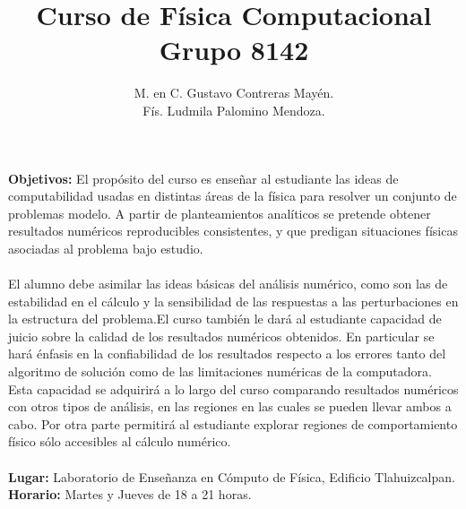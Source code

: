 \documentclass[12pt]{article}
\author{M. en C. Gustavo Contreras May\'{e}n.\\
F\'{i}s. Ludmila Palomino Mendoza.}
\title{Curso de F\'{i}sica Computacional\\{\large Grupo 8142}}
\date{ }
\begin{document}
\renewcommand\labelenumii{\theenumi.{\arabic{enumii}}}
\maketitle
\fontsize{12}{12}\selectfont
\textbf{Objetivos:}
El prop\'{o}sito del curso es enseñar al estudiante las ideas de computabilidad usadas en distintas \'{a}reas de la  f\'{i}sica para resolver un conjunto de problemas modelo. A partir de planteamientos anal\'{i}ticos se pretende obtener resultados num\'{e}ricos reproducibles consistentes, y que predigan situaciones f\'{i}sicas asociadas al problema bajo estudio.
\\
\\
El alumno debe asimilar las ideas b\'{a}sicas del análisis num\'{e}rico, como son las de estabilidad en el c\'{a}lculo y la sensibilidad de las respuestas a las perturbaciones en la estructura del problema.El curso tambi\'{e}n le dar\'{a} al estudiante capacidad de juicio sobre la calidad de los resultados num\'{e}ricos obtenidos. En particular se har\'{a} \'{e}nfasis en la confiabilidad de los resultados respecto a los errores tanto del algoritmo de soluci\'{o}n como de las limitaciones num\'{e}ricas de la computadora. Esta capacidad se adquirir\'{a} a lo largo del curso comparando resultados num\'{e}ricos con otros tipos de an\'{a}lisis, en las regiones en las cuales se pueden llevar ambos a cabo. Por otra parte permitir\'{a} al estudiante explorar regiones de comportamiento f\'{i}sico sólo accesibles al c\'{a}lculo num\'{e}rico.
\\
\\
\textbf{Lugar: }Laboratorio de Enseñanza en Cómputo de Física, Edificio Tlahuizcalpan.
\\
\textbf{Horario: } Martes y Jueves de 18 a 21 horas.
\\
\\
\end{document}
